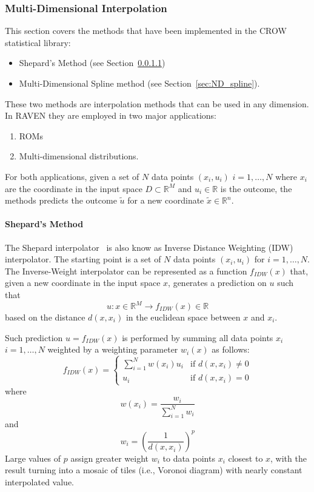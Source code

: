 \subsubsection{Multi-Dimensional Interpolation}
\label{sec:ND_interp}
This section covers the methods that have been implemented in the CROW statistical library:
\begin{itemize}
\item Shepard's Method (see Section~\ref{sec:shepard})
\item Multi-Dimensional Spline method (see Section~\ref{sec:ND_spline}).
\end{itemize}

These two methods are interpolation methods that can be used in any dimension.
In RAVEN they are employed in two major applications:
\begin{enumerate}
\item ROMs
\item Multi-dimensional distributions.
\end{enumerate}
For both applications, given a set of $N$ data points $ (x_i,u_i )$  $i=1,\ldots,N$ where $x_i$ are the coordinate in the input space $D \subset \mathbb{R}^M$ and $u_i \in \mathbb{R}$ is the outcome, the methods predicts the outcome $\tilde{u}$ for a new coordinate $\tilde{x}\in \mathbb{R}^n$.


\paragraph{Shepard's Method}
\label{sec:shepard}
The Shepard interpolator~\cite{Shepard} is also know as Inverse Distance Weighting (IDW) interpolator. 
The starting point is a set of $N$ data points $ (x_i,u_i )$ for $i=1,\ldots,N$. 
The Inverse-Weight interpolator can be represented as a function $f_{IDW}(x)$ that, given a new coordinate in the input space $x$, generates a prediction on $u$ such that 
\begin{equation}
u:x \in \mathbb{R}^M \rightarrow f_{IDW}(x) \in \mathbb{R}
\end{equation}
based on the distance $d(x,x_i)$ in the euclidean space between $x$ and $x_i$.

Such prediction $u=f_{IDW}(x)$ is performed by summing all data points $x_i$ $i=1,\ldots,N$ weighted by a weighting parameter $w_i (x)$ as follows:
\begin{equation}
f_{IDW}(x) = 
\left\{
\begin{matrix}
\sum_{i=1}^{N} w(x_i) u_i &  \text{if } d(x,x_i) \neq 0 \\
 u_i &  \text{if } d(x,x_i) = 0
\end{matrix}\right.
\end{equation}
where
\begin{equation}
w(x_i) =\frac{w_i}{\sum_{i=1}^{N} w_i}
\end{equation}
and
\begin{equation}
w_i = \left ( \frac{1}{d(x,x_i)} \right )^p
\end{equation}
Large values of $p$ assign greater weight $w_i$ to data points $x_i$ closest to $x$, with the result turning into a mosaic of tiles (i.e., Voronoi diagram) with nearly constant interpolated value.

